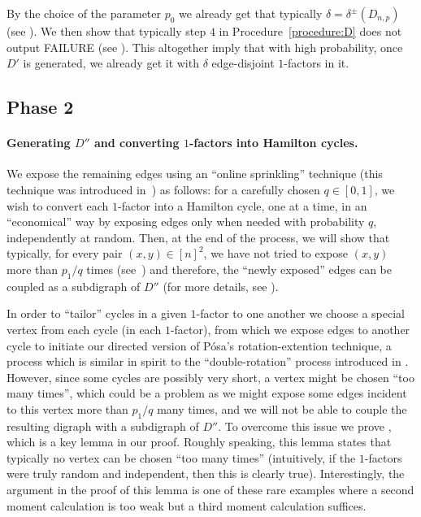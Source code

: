 \documentclass{article}
\begin{document}
	By the choice of the parameter $p_0$ we already get that typically $\delta = \delta^{\pm}(D_{n,p})$ (see ).
	We then show that typically step $4$ in Procedure~\ref{procedure:D} does not output FAILURE (see ).
	This altogether imply that with high probability, once $D'$ is generated, we already get it with $\delta$ edge-disjoint $1$-factors in it.
	
	\subsection{Phase 2}
	\paragraph*{Generating $D''$ and converting $1$-factors into Hamilton cycles.}
	We expose the remaining edges using an ``online sprinkling'' technique (this technique was introduced in~\cite{OnlineSprinkling}) as follows: for a carefully chosen $q\in [0,1]$, we wish to convert each $1$-factor into a Hamilton cycle, one at a time,  in an ``economical'' way by exposing edges only when needed with probability $q$, independently at random. 
	Then, at the end of the process, we will show that typically, for every pair $(x,y)\in [n]^2$, we have not tried to expose $(x,y)$ more than $p_1/q$ times (see~) and therefore, the ``newly exposed'' edges can be coupled as a subdigraph of $D''$ (for more details, see \cite{OnlineSprinkling}). 
	
	In order to ``tailor'' cycles in a given $1$-factor to one another we choose a special vertex from each cycle (in each $1$-factor), from which we expose edges to another cycle to initiate our directed version of P\'{o}sa's rotation-extention technique, a process which is similar in spirit to the ``double-rotation'' process introduced in \cite{frieze1988algorithm}.
	However, since some cycles are possibly very short, a vertex might be chosen ``too many times'', which could be a problem as we might expose some edges incident to this vertex more than $p_1/q$ many times, and we will not be able to couple the resulting digraph with a subdigraph of $D''$.
	To overcome this issue we prove , which is a key lemma in our proof. 
	Roughly speaking, this lemma states that typically no vertex can be chosen ``too many times'' (intuitively, if the $1$-factors were truly random and independent, then this is clearly true).
	Interestingly, the argument in the proof of this lemma is one of these rare examples where a second moment calculation is too weak but a third moment calculation suffices.
	
\end{document}
